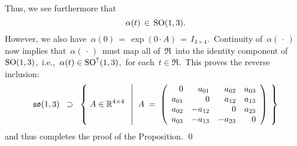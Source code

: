 Thus, we see furthermore that
\begin{equation*}
\alpha(t) \,\in\, \textnormal{SO}(1,3).
\end{equation*}
However, we also have \,$\alpha(0) \,=\, \exp(0\cdot\!A) \,=\, I_{4 \times 4}$.\,
Continuity of \,$\alpha(\,\cdot\,)$\, now implies that \,$\alpha(\,\cdot\,)$\,
must map all of \,$\Re$\, into the identity component of \,$\textnormal{SO}(1,3)$,\,
i.e., \,$\alpha(t) \in \textnormal{SO}^{\uparrow}(1,3)$,\,
for each \,$t \in \Re$.\,
This proves the reverse inclusion:
\begin{equation*}
\so{(1,3)}
\;\; \supset \;\;
	\left\{\;
		A
		\overset{{\color{white}.}}{\in}
		\Re^{4 \times 4}
		\;\;\left\vert\;\;
			A \;=\;
			\left(\begin{array}{rrrr}
			        0 &   a_{01} &  a_{02} & a_{03} \\
			a_{01} &           0 &  a_{12} & a_{13} \\
			a_{02} & -a_{12} &           0 & a_{23} \\
			a_{03} & -a_{13} & -a_{23} &          0 \\
			\end{array}\right)
			\right.
		\;\right\}
\end{equation*}
and thus completes the proof of the Proposition.
\qed


